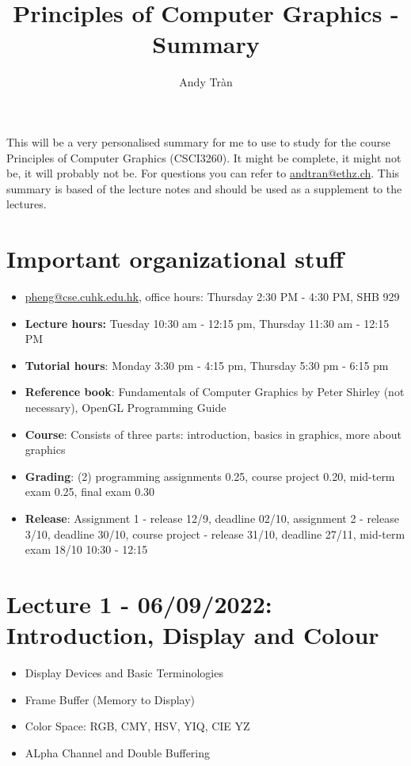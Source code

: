\documentclass[11pt]{article}
\begin{document}
 
 
\title{Principles of Computer Graphics - Summary}%
\author{Andy Tràn}
 
\maketitle %

This will be a very personalised summary for me to use to study for the course Principles of Computer Graphics (CSCI3260). It might be complete, it might not be, it will probably not be. For questions you can refer to \href{mailto:andtran@ethz.ch}{andtran@ethz.ch}. This summary is based of the lecture notes and should be used as a supplement to the lectures. 

\tableofcontents

\newpage

\section{Important organizational stuff}
\begin{itemize}
    \item \href{mailto:pheng@cse.cuhk.edu.hk}{pheng@cse.cuhk.edu.hk}, office hours: Thursday 2:30 PM - 4:30 PM, SHB 929
    \item \textbf{Lecture hours:}  Tuesday 10:30 am - 12:15 pm, Thursday 11:30 am - 12:15 PM
    \item \textbf{Tutorial hours}: Monday 3:30 pm - 4:15 pm, Thursday 5:30 pm - 6:15 pm 
    \item \textbf{Reference book}: Fundamentals of Computer Graphics by Peter Shirley (not necessary), OpenGL Programming Guide
    \item \textbf{Course}: Consists of three parts: introduction, basics in graphics, more about graphics 
    \item \textbf{Grading}: (2) programming assignments 0.25, course project 0.20, mid-term exam 0.25, final exam 0.30
    \item \textbf{Release}: Assignment 1 - release 12/9, deadline 02/10, assignment 2 - release 3/10, deadline 30/10, course project - release 31/10, deadline 27/11, mid-term exam 18/10 10:30 - 12:15
\end{itemize}
\section{Lecture 1 - 06/09/2022: Introduction, Display and Colour}
\begin{itemize}
    \item Display Devices and Basic Terminologies
    \item Frame Buffer (Memory to Display)
    \item Color Space: RGB, CMY, HSV, YIQ, CIE YZ
    \item ALpha Channel and Double Buffering
\end{itemize}
\end{document}
